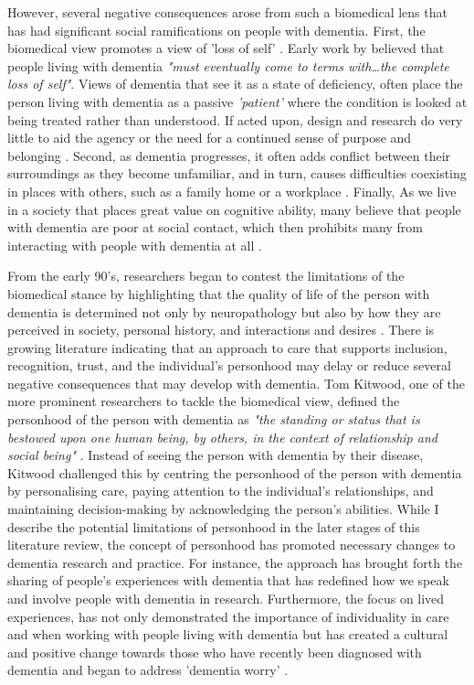 However, several negative consequences arose from such a biomedical lens that has had significant social ramifications on people with dementia. First, the biomedical view promotes a view of 'loss of self' \citep{ryan_dementia_2009}. Early work by \cite{cohen_loss_1986} believed that people living with dementia \textit{"must eventually come to terms with…the complete loss of self"}. Views of dementia that see it as a state of deficiency, often place the person living with dementia as a passive \textit{'patient'} where the condition is looked at being treated rather than understood. If acted upon, design and research do very little to aid the agency or the need for a continued sense of purpose and belonging \citep{hampson_dementia:_2016}. Second, as dementia progresses, it often adds conflict between their surroundings as they become unfamiliar, and in turn, causes difficulties coexisting in places with others, such as a family home or a workplace \citep{langdon_making_2007}. Finally, As we live in a society that places great value on cognitive ability, many believe that people with dementia are poor at social contact, which then prohibits many from interacting with people with dementia at all \citep{killick_communication_2001}.

From the early 90's, researchers began to contest the limitations of the biomedical stance by highlighting that the quality of life of the person with dementia is determined not only by neuropathology but also by how they are perceived in society, personal history, and interactions and desires \citep{o2007personhood}. There is growing literature indicating that an approach to care that supports inclusion, recognition, trust, and the individual's personhood may delay or reduce several negative consequences that may develop with dementia. Tom Kitwood, one of the more prominent researchers to tackle the biomedical view, defined the personhood of the person with dementia as \textit{"the standing or status that is bestowed upon one human being, by others, in the context of relationship and social being"} \citep[pg.8]{kitwood1997dementia}. Instead of seeing the person with dementia by their disease, Kitwood challenged this by centring the personhood of the person with dementia by personalising care, paying attention to the individual's relationships, and maintaining decision-making by acknowledging the person's abilities. While I describe the potential limitations of personhood in the later stages of this literature review, the concept of personhood has promoted necessary changes to dementia research and practice. For instance, the approach has brought forth the sharing of people's experiences with dementia that has redefined how we speak and involve people with dementia in research. Furthermore, the focus on lived experiences, has not only demonstrated the importance of individuality in care and when working with people living with dementia but has created a cultural and positive change towards those who have recently been diagnosed with dementia and began to address 'dementia worry' \citep{kessler_dementia_2012}.

